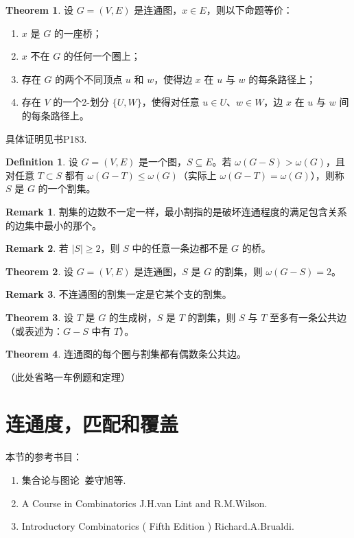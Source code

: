 \documentclass[oneside]{book}
\theoremstyle{definition}
\newtheorem{definition}{Definition}[section]
\newtheorem{theorem}{Theorem}[section]
\newtheorem{remark}{Remark}[section]
\begin{document}
\begin{theorem}
	设 \( G=(V,E) \) 是连通图，\( x \in E \)，则以下命题等价：
	\begin{enumerate}
		\item \( x \) 是 \( G \) 的一座桥；
		\item \( x \) 不在 \( G \) 的任何一个圈上；
		\item 存在 \( G \) 的两个不同顶点 \( u \) 和 \( w \)，使得边 \( x \) 在 \( u \) 与 \( w \) 的每条路径上；
		\item 存在 \( V \) 的一个2-划分 \( \{U,W\} \)，使得对任意 \( u \in U \)、\( w \in W \)，边 \( x \) 在 \( u \) 与 \( w \) 间的每条路径上。
	\end{enumerate}
\end{theorem}
具体证明见书P183.
\begin{definition}
	设 \( G=(V,E) \) 是一个图，\( S \subseteq E \)。若 \( \omega(G-S) > \omega(G) \)，且对任意 \( T \subset S \) 都有 \( \omega(G-T) \leq \omega(G) \)（实际上 \( \omega(G-T)=\omega(G) \)），则称 \( S \) 是 \( G \) 的一个割集。
\end{definition}

\begin{remark}
	割集的边数不一定一样，最小割指的是破坏连通程度的满足包含关系的边集中最小的那个。
\end{remark}
\begin{remark}
	若 \( |S| \geq 2 \)，则 \( S \) 中的任意一条边都不是 \( G \) 的桥。
\end{remark}

\begin{theorem}
	设 \( G=(V,E) \) 是连通图，\( S \) 是 \( G \) 的割集，则 \( \omega(G-S) = 2 \)。
\end{theorem}

\begin{remark}
	不连通图的割集一定是它某个支的割集。
\end{remark}

\begin{theorem}
	设 \( T \) 是 \( G \) 的生成树，\( S \) 是 \( T \) 的割集，则 \( S \) 与 \( T \) 至多有一条公共边（或表述为：\( G-S \) 中有 \(T\)）。
\end{theorem}

\begin{theorem}
	连通图的每个圈与割集都有偶数条公共边。
\end{theorem}

（此处省略一车例题和定理）


\chapter{连通度，匹配和覆盖}
本节的参考书目：
\begin{enumerate}
	\item 集合论与图论   \( \ \)姜守旭等.
	\item A Course in Combinatorics J.H.van Lint and R.M.Wilson.
	\item Introductory Combinatorics ( Fifth Edition ) Richard.A.Brualdi.
\end{enumerate}
\end{document}
